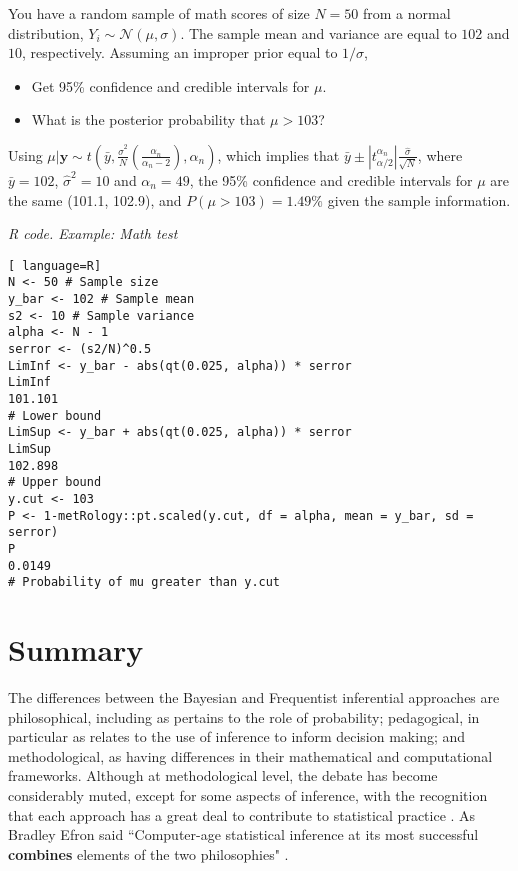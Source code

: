 You have a random sample of math scores of size $N=50$ from a normal distribution, $Y_i\sim \mathcal{N}(\mu, \sigma)$. The sample mean and variance are equal to $102$ and $10$, respectively. Assuming an improper prior equal to $1/\sigma$, 

\begin{itemize}
	\item Get 95\% confidence and credible intervals for $\mu$.
	\item What is the posterior probability that $\mu > 103$?  
\end{itemize}

Using $\mu|\mathbf{y}\sim t\left(\bar{y},\frac{\hat{\sigma}^2}{N}\left(\frac{\alpha_n}{\alpha_n-2}\right),\alpha_n\right)$, which implies that $\bar{y}\pm |t_{\alpha/2}^{\alpha_n}|\frac{\hat{\sigma}}{\sqrt{N}}$, where $\bar{y}=102$, $\hat{\sigma}^2=10$ and $\alpha_n=49$, the 95\% confidence and credible intervals for $\mu$ are the same (101.1, 102.9), and $P(\mu>103)=1.49\%$ given the sample information.

\begin{tcolorbox}[enhanced,width=4.67in,center upper,
	fontupper=\large\bfseries,drop shadow southwest,sharp corners]
	\textit{R code. Example: Math test}
\begin{VF}
\begin{lstlisting}[ language=R]
N <- 50 # Sample size
y_bar <- 102 # Sample mean
s2 <- 10 # Sample variance
alpha <- N - 1
serror <- (s2/N)^0.5 
LimInf <- y_bar - abs(qt(0.025, alpha)) * serror
LimInf
101.101
# Lower bound
LimSup <- y_bar + abs(qt(0.025, alpha)) * serror
LimSup
102.898
# Upper bound
y.cut <- 103
P <- 1-metRology::pt.scaled(y.cut, df = alpha, mean = y_bar, sd = serror)
P
0.0149
# Probability of mu greater than y.cut
\end{lstlisting}
\end{VF}
\end{tcolorbox}



\section{Summary}\label{sec27}

The differences between the Bayesian and Frequentist inferential approaches are philosophical, including as pertains to the role of probability; pedagogical, in particular as relates to the use of inference to inform decision making; and methodological, as having differences in their mathematical and computational frameworks. Although at methodological level, the debate has become considerably muted, except for some aspects of inference, with the recognition that each approach has a great deal to contribute to statistical practice \cite{Good1992, Bayarri2004, Kass2011}. As Bradley Efron said ``Computer-age statistical inference at its most successful \textbf{combines} elements of the two philosophies" \cite{efron2016computer}.

